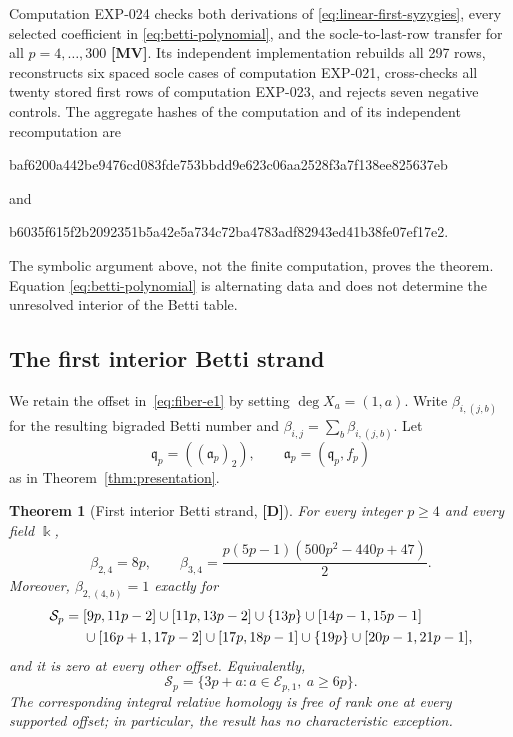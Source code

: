 \documentclass[11pt]{article}
\newtheorem{theorem}{Theorem}[section]
\theoremstyle{definition}
\theoremstyle{remark}
\newcommand{\kfield}{\Bbbk}
\begin{document}
Computation EXP-024 checks both derivations of \eqref{eq:linear-first-syzygies}, every selected
coefficient in \eqref{eq:betti-polynomial}, and the socle-to-last-row transfer for all
$p=4,\ldots,300$ {\bf[MV]}. Its independent implementation rebuilds all 297 rows, reconstructs
six spaced socle cases of computation EXP-021, cross-checks all twenty stored first rows of
computation EXP-023, and rejects seven negative controls. The aggregate hashes of the computation
and of its independent recomputation are
\begin{center}
{\fontsize{7}{8}\selectfont\ttfamily
baf6200a442be9476cd083fde753bbdd9e623c06aa2528f3a7f138ee825637eb}
\end{center}
and
\begin{center}
{\fontsize{7}{8}\selectfont\ttfamily
b6035f615f2b2092351b5a42e5a734c72ba4783adf82943ed41b38fe07ef17e2}.
\end{center}
The symbolic argument above, not the finite computation, proves the theorem. Equation
\eqref{eq:betti-polynomial} is alternating data and does not determine the unresolved interior of
the Betti table.

\subsection{The first interior Betti strand}

We retain the offset in~\eqref{eq:fiber-e1} by setting
\(\deg X_a=(1,a)\). Write \(\beta_{i,(j,b)}\) for the resulting bigraded Betti number and
\(\beta_{i,j}=\sum_b\beta_{i,(j,b)}\). Let
\[
\mathfrak q_p=((\mathfrak a_p)_2),
\qquad
\mathfrak a_p=(\mathfrak q_p,f_p)
\]
as in Theorem~\ref{thm:presentation}.

\begin{theorem}[First interior Betti strand, {\bf[D]}]
\label{thm:interior-strand}
For every integer \(p\ge4\) and every field \(\kfield\),
\begin{equation}
\beta_{2,4}=8p,
\qquad
\beta_{3,4}=\frac{p(5p-1)(500p^2-440p+47)}{2}.
\label{eq:first-interior}
\end{equation}
Moreover, \(\beta_{2,(4,b)}=1\) exactly for
\begin{align}
\mathcal S_p={}&[9p,11p-2]\cup[11p,13p-2]\cup\{13p\}
\cup[14p-1,15p-1]\notag\\
&\cup[16p+1,17p-2]\cup[17p,18p-1]\cup\{19p\}
\cup[20p-1,21p-1],
\label{eq:interior-support}
\end{align}
and it is zero at every other offset. Equivalently,
\[
\mathcal S_p=\{3p+a:a\in\mathcal E_{p,1},\ a\ge6p\}.
\]
The corresponding integral relative homology is free of rank one at every supported offset; in
particular, the result has no characteristic exception.
\end{theorem}
\end{document}
